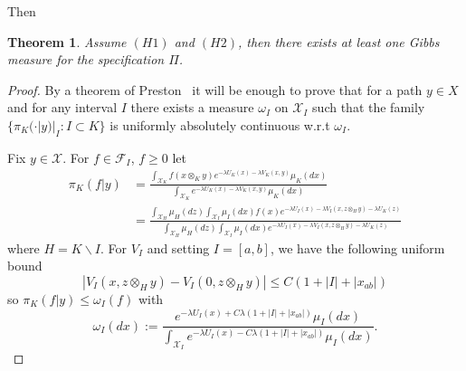 \documentclass[a4paper,12pt,reqno]{amsart}
\newtheorem{theorem}{Theorem}
\newcommand{\X}{\mathcal{X}}
\begin{document}
Then

\begin{theorem}
\label{th:existence}
Assume $(H1)$ and $(H2)$, then there exists at least one Gibbs measure
for the specification $\Pi$.  
\end{theorem}
\begin{proof}
By a theorem of Preston~\cite{Preston} it will be enough to prove that for a
path $y \in X$ and for any
interval $I$ there exists a
measure $\omega_I$ on $\X_I$ such that the family 
$\{ \pi_K(\cdot|y)|_I :  I \subset K \}$ is uniformly absolutely
continuous w.r.t $\omega_I$.

Fix $y \in \X$. For $f \in \mathcal{F}_I$, $f \ge 0$ let
\begin{equation}
  \begin{split}
\pi_K(f|y) & = \frac{\int_{\X_K} f(x \otimes_K y) e^{-\lambda U_K(x)
    -\lambda V_K(x,y)} \mu_K(dx)}{\int_{\X_K}  e^{-\lambda U_K(x)
    -\lambda V_K(x,y)} \mu_K(dx)}
\\  & = \frac{\int_{\X_H} \mu_H(dz) \int_{\X_I} \mu_I(dx) f(x) e^{-\lambda U_I(x)
    -\lambda V_I(x, z \otimes_H y) - \lambda U_K(z)}}{\int_{\X_H} \mu_H(dz) \int_{\X_I} \mu_I(dx) e^{-\lambda U_I(x)
    -\lambda V_I(x,  z \otimes_H y) - \lambda U_K(z)}}   
  \end{split}
\end{equation}
where $H = K \backslash I$.
For $V_I$ and setting $I = [a,b]$, we have the following uniform bound
\begin{equation}
|V_I(x,z \otimes_H y)-V_I(0,z \otimes_H y)| \le C  (1+|I|+|x_{ab}|)  
\end{equation}
so $
\pi_K(f|y)  \le
 \omega_I(f)$
with
$$
\omega_I(dx) :=  \frac{   e^{-\lambda U_I(x) + C \lambda
 (1+|I|+|x_{ab}|)}  \mu_I(dx)}{ \int_{\X_I}  e^{-\lambda U_I(x) - C \lambda
 (1+|I|+|x_{ab}|)}\mu_I(dx)}.
$$
\end{proof}
\end{document}
